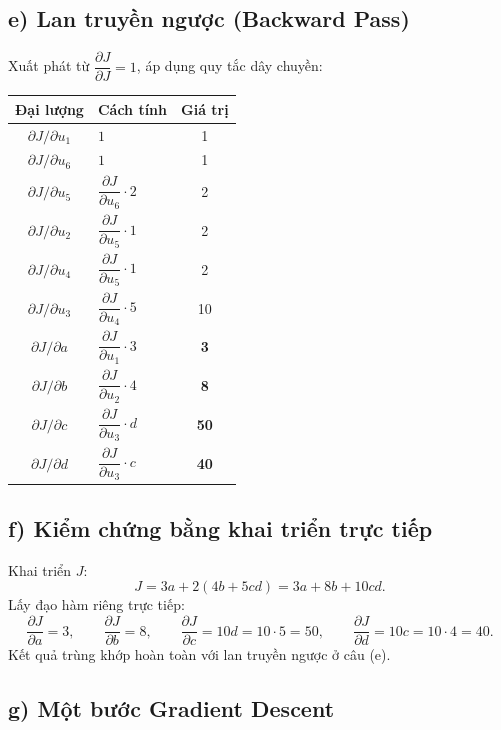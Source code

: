 \documentclass[a4paper,12pt]{article}
\begin{document}
\subsection*{e) Lan truyền ngược (Backward Pass)}

Xuất phát từ $\dfrac{\partial J}{\partial J} = 1$, áp dụng quy tắc dây chuyền:

\begin{center}
\begin{tabular}{|c|l|c|}
\hline
Đại lượng & Cách tính & Giá trị \\
\hline
$\partial J/\partial u_1$ & $1$ & 1 \\
$\partial J/\partial u_6$ & $1$ & 1 \\
$\partial J/\partial u_5$ & $\dfrac{\partial J}{\partial u_6}\cdot 2$ & 2 \\
$\partial J/\partial u_2$ & $\dfrac{\partial J}{\partial u_5}\cdot 1$ & 2 \\
$\partial J/\partial u_4$ & $\dfrac{\partial J}{\partial u_5}\cdot 1$ & 2 \\
$\partial J/\partial u_3$ & $\dfrac{\partial J}{\partial u_4}\cdot 5$ & 10 \\
$\partial J/\partial a$ & $\dfrac{\partial J}{\partial u_1}\cdot 3$ & \textbf{3} \\
$\partial J/\partial b$ & $\dfrac{\partial J}{\partial u_2}\cdot 4$ & \textbf{8} \\
$\partial J/\partial c$ & $\dfrac{\partial J}{\partial u_3}\cdot d$ & \textbf{50} \\
$\partial J/\partial d$ & $\dfrac{\partial J}{\partial u_3}\cdot c$ & \textbf{40} \\
\hline
\end{tabular}
\end{center}

\subsection*{f) Kiểm chứng bằng khai triển trực tiếp}

Khai triển $J$:
\[ J = 3a + 2(4b + 5cd) = 3a + 8b + 10cd. \]
Lấy đạo hàm riêng trực tiếp:
\[ \frac{\partial J}{\partial a} = 3, \qquad \frac{\partial J}{\partial b} = 8, \qquad
   \frac{\partial J}{\partial c} = 10d = 10\cdot 5 = 50, \qquad
   \frac{\partial J}{\partial d} = 10c = 10\cdot 4 = 40. \]
Kết quả trùng khớp hoàn toàn với lan truyền ngược ở câu (e).

\subsection*{g) Một bước Gradient Descent}
\end{document}
